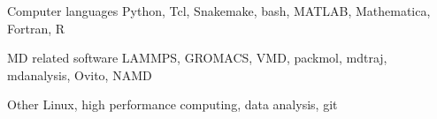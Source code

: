 
\begin{cvskills}
  
  \cvskill
    {Computer languages} %
    {Python, Tcl, Snakemake, bash, MATLAB, Mathematica, Fortran, R} %

  \cvskill
    {MD related software} %
    {LAMMPS, GROMACS, VMD, packmol, mdtraj, mdanalysis, Ovito, NAMD} %
  
  \cvskill
    {Other} %
    {Linux, high performance computing, data analysis, git} %
    
\end{cvskills}
